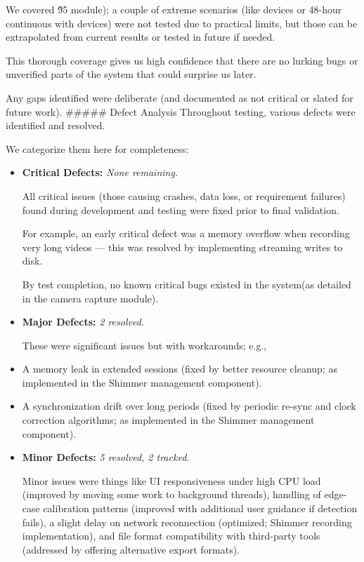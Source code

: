 {{{{{{{We covered \~95%
module); a couple of extreme scenarios (like  devices or 48-hour continuous with
 devices) were not tested due to practical limits, but those can be extrapolated
from current results or tested in future if needed.

This thorough coverage gives us high confidence that there are no lurking bugs or
unverified parts of the system that could surprise us later.

Any gaps identified were deliberate (and documented as not critical or slated for
future work).  ##### Defect Analysis Throughout testing, various defects were
identified and resolved.

We categorize them here for completeness: \begin{itemize}

\item \textbf{Critical Defects:}
 \textit{None remaining.}

All critical issues (those causing crashes, data loss, or requirement failures) found
during development and testing were fixed prior to final validation.

For example, an early critical defect was a memory overflow when recording very long
videos --- this was resolved by implementing streaming writes to disk.

By test completion, no known critical bugs existed in the system(as detailed in the
camera capture module).

\item \textbf{Major Defects:}
 \textit{2 resolved.}

These were significant issues but with workarounds; e.g.,
\item A memory leak in extended sessions (fixed by better resource cleanup; as implemented in the Shimmer management component).

\item A synchronization drift over long periods (fixed by periodic re-sync and clock correction algorithms; as implemented in the Shimmer management component).

\item \textbf{Minor Defects:}
 \textit{5 resolved, 2 tracked.}

Minor issues were things like UI responsiveness under high CPU load (improved by
moving some work to background threads), handling of edge-case calibration patterns
(improved with additional user guidance if detection fails), a slight delay on
network reconnection (optimized; Shimmer recording implementation), and file format
compatibility with third-party tools (addressed by offering alternative export
formats).


\end{itemize}}}}}}}}
